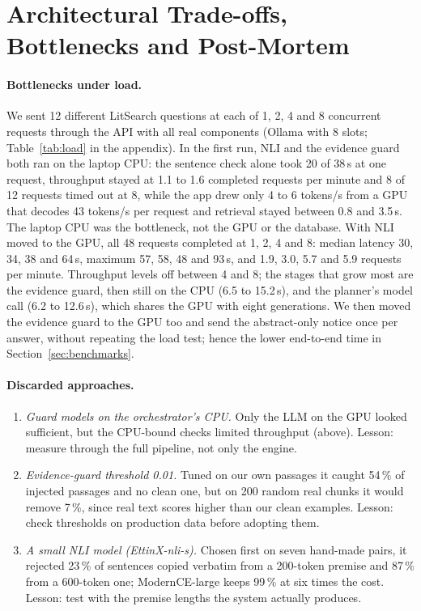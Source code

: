 \section{Architectural Trade-offs, Bottlenecks and Post-Mortem}
\label{sec:tradeoffs}

\paragraph{Bottlenecks under load.}
We sent 12 different LitSearch questions at each of 1, 2, 4 and 8 concurrent requests through the API with all real components (Ollama with 8 slots; Table~\ref{tab:load} in the appendix).
In the first run, NLI and the evidence guard both ran on the laptop CPU: the sentence check alone took 20 of 38\,s at one request, throughput stayed at 1.1 to 1.6 completed requests per minute and 8 of 12 requests timed out at 8, while the app drew only 4 to 6 tokens/s from a GPU that decodes 43 tokens/s per request and retrieval stayed between 0.8 and 3.5\,s.
The laptop CPU was the bottleneck, not the GPU or the database.
With NLI moved to the GPU, all 48 requests completed at 1, 2, 4 and 8: median latency 30, 34, 38 and 64\,s, maximum 57, 58, 48 and 93\,s, and 1.9, 3.0, 5.7 and 5.9 requests per minute.
Throughput levels off between 4 and 8; the stages that grow most are the evidence guard, then still on the CPU (6.5 to 15.2\,s), and the planner's model call (6.2 to 12.6\,s), which shares the GPU with eight generations.
We then moved the evidence guard to the GPU too and send the abstract-only notice once per answer, without repeating the load test; hence the lower end-to-end time in Section~\ref{sec:benchmarks}.

\paragraph{Discarded approaches.}
\begin{enumerate}\setlength{\itemsep}{0pt}\setlength{\topsep}{0pt}
\item \emph{Guard models on the orchestrator's CPU.} Only the LLM on the GPU looked sufficient, but the CPU-bound checks limited throughput (above). Lesson: measure through the full pipeline, not only the engine.
\item \emph{Evidence-guard threshold 0.01.} Tuned on our own passages it caught 54\,\% of injected passages and no clean one, but on 200 random real chunks it would remove 7\,\%, since real text scores higher than our clean examples. Lesson: check thresholds on production data before adopting them.
\item \emph{A small NLI model (EttinX-nli-s).} Chosen first on seven hand-made pairs, it rejected 23\,\% of sentences copied verbatim from a 200-token premise and 87\,\% from a 600-token one; ModernCE-large keeps 99\,\% at six times the cost. Lesson: test with the premise lengths the system actually produces.
\end{enumerate}

